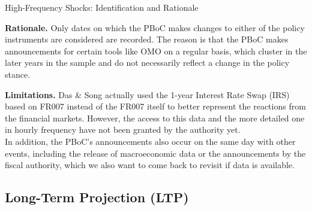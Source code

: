 \documentclass[10pt,aspectratio=169,t]{beamer}
\begin{document}
\begin{frame}{High-Frequency Shocks: Identification and Rationale}

\textbf{Rationale.} Only dates on which the PBoC makes changes to either of the policy instruments are considered are recorded. The reason is that the PBoC makes announcements for certain tools like OMO on a regular basis, which cluster in the later years in the sample and do not necessarily reflect a change in the policy stance.

\textbf{Limitations.} Das \& Song actually used the 1-year Interest Rate Swap (IRS) based on FR007 instead of the FR007 itself to better represent the reactions from the financial markets. However, the access to this data and the more detailed one in hourly frequency have not been granted by the authority yet.\\
In addition, the PBoC's announcements also occur on the same day with other events, including the release of macroeconomic data or the announcements by the fiscal authority, which we also want to come back to revisit if data is available.

\textcolor{spgray}{\scriptsize\hyperlink{app:hfi_series}{}}

\textcolor{spgray}{\scriptsize\hyperlink{app:hfi_irf}{}}

\textcolor{spgray}{\scriptsize\hyperlink{app:hfi_compare}{}}


\end{frame}

\subsection{Long-Term Projection (LTP)}
\end{document}

